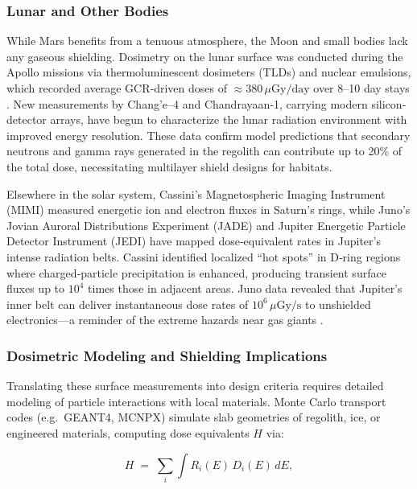 \documentclass[12pt]{report}
\begin{document}
\subsubsection{Lunar and Other Bodies}

While Mars benefits from a tenuous atmosphere, the Moon and small bodies lack any gaseous shielding.  Dosimetry on the lunar surface was conducted during the Apollo missions via thermoluminescent dosimeters (TLDs) and nuclear emulsions, which recorded average GCR‐driven doses of $\approx380\,\mu\mathrm{Gy/day}$ over 8–10 day stays \cite{mcclelland1978apollo}.  New measurements by Chang’e–4 and Chandrayaan‐1, carrying modern silicon‐detector arrays, have begun to characterize the lunar radiation environment with improved energy resolution.  These data confirm model predictions that secondary neutrons and gamma rays generated in the regolith can contribute up to 20\% of the total dose, necessitating multilayer shield designs for habitats.

Elsewhere in the solar system, Cassini’s Magnetospheric Imaging Instrument (MIMI) measured energetic ion and electron fluxes in Saturn’s rings, while Juno’s Jovian Auroral Distributions Experiment (JADE) and Jupiter Energetic Particle Detector Instrument (JEDI) have mapped dose‐equivalent rates in Jupiter’s intense radiation belts.  Cassini identified localized “hot spots” in D‐ring regions where charged‐particle precipitation is enhanced, producing transient surface fluxes up to $10^4$ times those in adjacent areas.  Juno data revealed that Jupiter’s inner belt can deliver instantaneous dose rates of $10^6\,\mu\mathrm{Gy/s}$ to unshielded electronics—a reminder of the extreme hazards near gas giants \cite{bolton2017juno}.

\subsubsection{Dosimetric Modeling and Shielding Implications}

Translating these surface measurements into design criteria requires detailed modeling of particle interactions with local materials.  Monte Carlo transport codes (e.g.\ GEANT4, MCNPX) simulate slab geometries of regolith, ice, or engineered materials, computing dose equivalents $H$ via:

\begin{equation}
  H \;=\; \sum_{i} \int R_i(E)\,D_i(E)\,dE,
  \label{eq:doseeq}
\end{equation}
\end{document}
